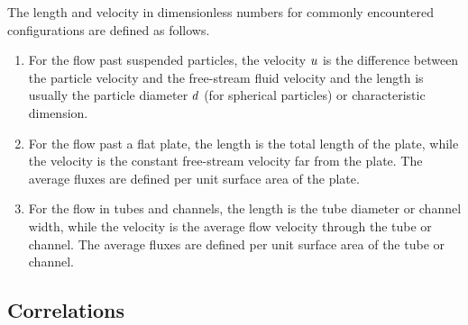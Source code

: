 The length and velocity in dimensionless numbers for commonly encountered configurations are defined as follows.
\begin{enumerate}
\item For the flow past suspended particles, the velocity $u$ is the difference between the particle velocity and the free-stream fluid velocity and the length is usually the particle diameter $d$ (for spherical particles) or characteristic dimension.

\item For the flow past a flat plate, the length is the total length of the plate, while the velocity is the constant free-stream velocity far from the plate. The average fluxes are defined per unit surface area of the plate.

\item For the flow in tubes and channels, the length is the tube diameter or channel width, while the velocity is the average flow velocity through the tube or channel. The average fluxes are defined per unit surface area of the tube or channel.
\end{enumerate}


\subsection{Correlations}


